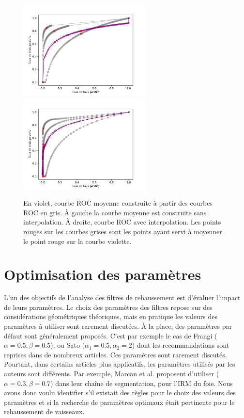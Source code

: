 \begin{figure}[ht]
  \centering
  \includegraphics[height=5cm]{Images/ROC_badMean.pdf}
  \includegraphics[height=5cm]{Images/ROC_goodMean.pdf}
  \caption{En violet, courbe ROC moyenne construite à partir des courbes ROC en gris. À gauche la courbe moyenne est construite sans interpolation. À droite, courbe ROC avec interpolation. Les points rouges sur les courbes grises sont les points ayant servi à moyenner le point rouge sur la courbe violette.}
  \label{fig:good_and_bad_roc}
\end{figure}

\section{Optimisation des paramètres}

L'un des objectifs de l'analyse des filtres de rehaussement est d'évaluer l'impact de leurs paramètres. Le choix des paramètres des filtres repose sur des considérations géométriques théoriques, mais en pratique les valeurs des paramètres à utiliser sont rarement discutées. À la place, des paramètres par défaut sont généralement proposés. C'est par exemple le cas de Frangi ($\alpha=0.5,\beta=0.5$), ou Sato $(\alpha_1=0.5,\alpha_2=2$) dont les recommandations sont reprises dans de nombreux articles. Ces paramètres sont rarement discutés. Pourtant, dans certains articles plus applicatifs, les paramètres utilisés par les auteurs sont différents. Par exemple, Marcan et al. \cite{Marcan2014_vessel_seg} proposent d'utiliser ($\alpha=0.3,\beta=0.7$) dans leur chaîne de segmentation,  pour l'IRM du foie. Nous avons donc voulu identifier s'il existait des règles pour le choix des valeurs des paramètres et si la recherche de paramètres optimaux était pertinente pour le rehaussement de vaisseaux.

